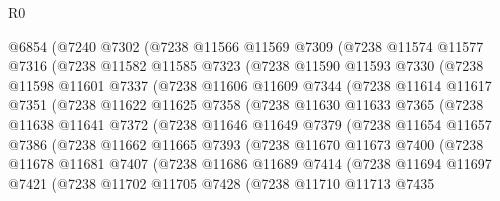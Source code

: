 \begin{lexlean}{R0}
\begin{coremodule}
    @6854
      (@7240
        @7302
        (@7238
          @11566
          @11569
          @7309
          (@7238
            @11574
            @11577
            @7316
            (@7238
              @11582
              @11585
              @7323
              (@7238
                @11590
                @11593
                @7330
                (@7238
                  @11598
                  @11601
                  @7337
                  (@7238
                    @11606
                    @11609
                    @7344
                    (@7238
                      @11614
                      @11617
                      @7351
                      (@7238
                        @11622
                        @11625
                        @7358
                        (@7238
                          @11630
                          @11633
                          @7365
                          (@7238
                            @11638
                            @11641
                            @7372
                            (@7238
                              @11646
                              @11649
                              @7379
                              (@7238
                                @11654
                                @11657
                                @7386
                                (@7238
                                  @11662
                                  @11665
                                  @7393
                                  (@7238
                                    @11670
                                    @11673
                                    @7400
                                    (@7238
                                      @11678
                                      @11681
                                      @7407
                                      (@7238
                                        @11686
                                        @11689
                                        @7414
                                        (@7238
                                          @11694
                                          @11697
                                          @7421
                                          (@7238
                                            @11702
                                            @11705
                                            @7428
                                            (@7238
                                              @11710
                                              @11713
                                              @7435

\end{coremodule}
\end{lexlean}
